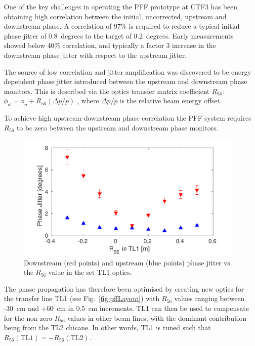 \documentclass[%
 reprint,
 amsmath,amssymb,
 prl,
]{revtex4-1}
\begin{document}
One of the key challenges in operating the PFF prototype at CTF3 has been 
obtaining high correlation between the initial, uncorrected, upstream and 
downstream phase. A correlation of 97\% is required to reduce a typical initial 
phase jitter of \(0.8\)~degrees to the target of \(0.2\)~degrees. Early 
measurements showed below 40\% correlation, and typically a factor 3 increase in the downstream phase jitter with respect to the upstream jitter.

The source of low correlation and jitter amplification was discovered to be energy dependent phase 
jitter introduced between the upstream and downstream phase monitors. This is 
described via the optics transfer matrix coefficient \(R_{56}\):
\(\phi_d = \phi_u + R_{56}(\Delta p / p)\)
, where \(\Delta p / p\) is the relative beam energy offset.


To achieve high upstream-downstream phase correlation the PFF system requires \(R_{56}\) to be zero between the upstream and 
downstream phase monitors.
\begin{figure}
	\includegraphics[width=\columnwidth]{figs/r56Scan}%
	\caption{\label{fig:r56Scan}Downstream (red points) and upstream (blue 
		points) phase jitter vs. the \(R_{56}\) value in the set TL1 optics. 
		}
\end{figure}

The phase propagation has therefore been optimised by creating new optics for the transfer line TL1 (see Fig.~\ref{fig:pffLayout}) with \(R_{56}\) values ranging between -30~cm and +60~cm in 0.5~cm increments. TL1 can then be used to compensate for the non-zero \(R_{56}\) values in other beam lines, with the dominant contribution being from the TL2 chicane. In other words, TL1 is tuned such that \(R_{56}(\mathrm{TL1}) = -R_{56}(\mathrm{TL2})\).
\end{document}
